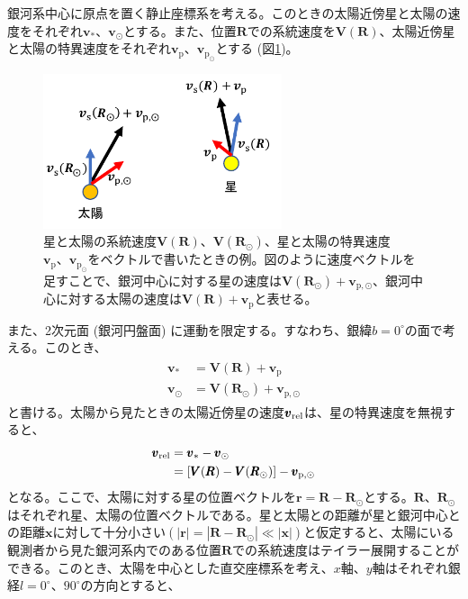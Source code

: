 銀河系中心に原点を置く静止座標系を考える。このときの太陽近傍星と太陽の速度をそれぞれ$\pmb{v}_{*}、\pmb{v}_{\odot}$とする。また、位置$\pmb{R}$での系統速度を$\pmb{V}(\pmb{R})$、太陽近傍星と太陽の特異速度をそれぞれ$\pmb{v}_{\mathrm{p}}、\pmb{v}_{\mathrm{p}_\odot}$とする (図\ref{fig:motion})。
\begin{figure}[htbp]
\begin{center}
	\includegraphics[width=7cm]{fig/motion.pdf}
	\caption {星と太陽の系統速度$\pmb{V}(\pmb{R})、\pmb{V}(\pmb{R_{\odot}})$、星と太陽の特異速度$\pmb{v}_{\mathrm{p}}、\pmb{v}_{\mathrm{p}_\odot}$をベクトルで書いたときの例。図のように速度ベクトルを足すことで、銀河中心に対する星の速度は$\pmb{V}(\pmb{R}_{\odot}) + \pmb{v}_{\mathrm{p},\odot}$、銀河中心に対する太陽の速度は$\pmb{V}(\pmb{R}) + \pmb{v}_{\mathrm{p}}$と表せる。}
	\label{fig:motion}
\end{center}
\end{figure}
また、2次元面 (銀河円盤面) に運動を限定する。すなわち、銀緯$b=0^{\circ}$の面で考える。このとき、
\begin{align}
\begin{aligned}
	\pmb{v}_* &= \pmb{V}(\pmb{R}) + \pmb{v}_{\mathrm{p}} \\
	\pmb{v}_{\odot} &= \pmb{V}(\pmb{R}_{\odot}) + \pmb{v}_{\mathrm{p},\odot}
\end{aligned}
\end{align}
と書ける。太陽から見たときの太陽近傍星の速度$\pmb{v}_{\rm rel}$は、星の特異速度を無視すると、
\begin{align}
\begin{aligned}
	\pmb{v}_{\rm rel} &= \pmb{v}_* - \pmb{v}_{\odot} \\
	&= [\pmb{V}(\pmb{R}) - \pmb{V}(\pmb{R}_{\odot})] - \pmb{v}_{\mathrm{p},\odot}
\end{aligned}
\end{align}
となる。ここで、太陽に対する星の位置ベクトルを$\pmb{r} = \pmb{R} - \pmb{R}_{\odot}$とする。$\pmb{R}、\pmb{R}_{\odot}$はそれぞれ星、太陽の位置ベクトルである。星と太陽との距離が星と銀河中心との距離$\pmb{x}$に対して十分小さい$(|\pmb{r}| = |\pmb{R}-\pmb{R}_{\odot}| \ll |\pmb{x}|)$と仮定すると、太陽にいる観測者から見た銀河系内でのある位置$\pmb{R}$での系統速度はテイラー展開することができる。このとき、太陽を中心とした直交座標系を考え、$x$軸、$y$軸はそれぞれ銀経$l=0^{\circ}、90^{\circ}$の方向とすると、
